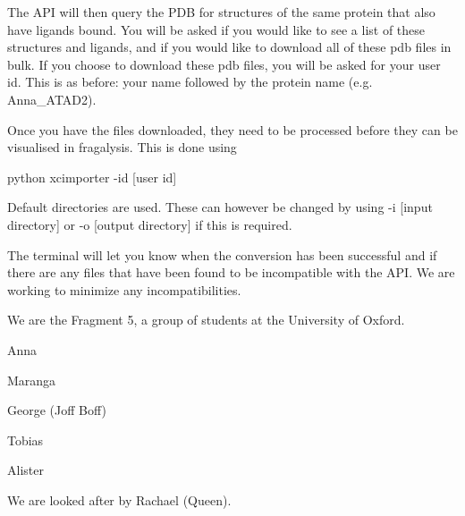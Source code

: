The A\+PI will then query the P\+DB for structures of the same protein that also have ligands bound. You will be asked if you would like to see a list of these structures and ligands, and if you would like to download all of these pdb files in bulk. If you choose to download these pdb files, you will be asked for your user id. This is as before\+: your name followed by the protein name (e.\+g. Anna\+\_\+\+A\+T\+A\+D2).

Once you have the files downloaded, they need to be processed before they can be visualised in fragalysis. This is done using


\begin{DoxyCode}
python xcimporter -id [user id] 
\end{DoxyCode}


Default directories are used. These can however be changed by using {\ttfamily -\/i \mbox{[}input directory\mbox{]}} or {\ttfamily -\/o \mbox{[}output directory\mbox{]}} if this is required.

The terminal will let you know when the conversion has been successful and if there are any files that have been found to be incompatible with the A\+PI. We are working to minimize any incompatibilities.

We are the \textquotesingle{}Fragment 5\textquotesingle{}, a group of students at the University of Oxford.


\begin{DoxyItemize}
\item Anna
\item Maranga
\item George (Joff Boff)
\item Tobias
\item Alister
\end{DoxyItemize}

We are looked after by Rachael (Queen). 